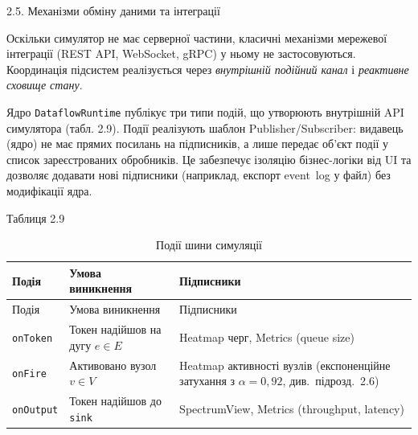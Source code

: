 \documentclass[
]{article}
\begin{document}
\protect{}\label{_Toc228121469}{}2.5. Механізми обміну
даними та інтеграції

Оскільки симулятор не має серверної частини, класичні механізми
мережевої інтеграції (REST API, WebSocket, gRPC) у ньому не
застосовуються. Координація підсистем реалізується через
\emph{внутрішній подійний канал} і \emph{реактивне сховище стану}.

Ядро \texttt{DataflowRuntime} публікує три типи подій, що утворюють
внутрішній API симулятора (табл. 2.9). Події реалізують шаблон
Publisher/Subscriber: видавець (ядро) не має прямих посилань на
підписників, а лише передає об'єкт події у список зареєстрованих
обробників. Це забезпечує ізоляцію бізнес-логіки від UI та дозволяє
додавати нові підписники (наприклад, експорт event~log у файл) без
модифікації ядра.

Таблиця 2.9

\begin{longtable}[]{@{}
  >{\raggedright\arraybackslash}p{}
  >{\raggedright\arraybackslash}p{}
  >{\raggedright\arraybackslash}p{}@{}}
\caption{Події шини симуляції}\tabularnewline
\toprule\noalign{}
\begin{minipage}[b]{\linewidth}\raggedright
Подія
\end{minipage} & \begin{minipage}[b]{\linewidth}\raggedright
Умова виникнення
\end{minipage} & \begin{minipage}[b]{\linewidth}\raggedright
Підписники
\end{minipage} \\
\midrule\noalign{}
\endfirsthead
\toprule\noalign{}
\begin{minipage}[b]{\linewidth}\raggedright
Подія
\end{minipage} & \begin{minipage}[b]{\linewidth}\raggedright
Умова виникнення
\end{minipage} & \begin{minipage}[b]{\linewidth}\raggedright
Підписники
\end{minipage} \\
\midrule\noalign{}
\endhead
\bottomrule\noalign{}
\endlastfoot
\texttt{onToken} & Токен надійшов на дугу \(e \in E\) & Heatmap черг,
Metrics (queue size) \\
\texttt{onFire} & Активовано вузол \(v \in V\) & Heatmap активності
вузлів (експоненційне затухання з \(\alpha = 0{,}92\), див.~підрозд.~2.6) \\
\texttt{onOutput} & Токен надійшов до \texttt{sink} & SpectrumView,
Metrics (throughput, latency) \\
\end{longtable}
\end{document}
